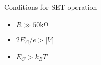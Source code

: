\documentclass[../main.tex]{subfiles}
\begin{document}
\begin{frame}{Conditions for SET operation}
\begin{itemize}
    \item \(R \gg 50\unit{\kilo\ohm}\)
    \item \(2E_{C}/e > |V|\)
    \item \(E_{C} > k_{B}T\)
\end{itemize}
\end{frame}


%

\end{document}
